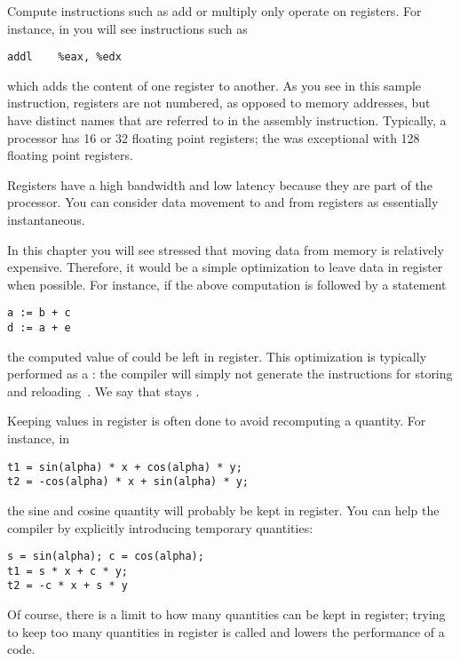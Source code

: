 Compute instructions such as add or multiply only operate on
registers. For instance, in 
you will see instructions such as
\begin{verbatim}
addl	%eax, %edx
\end{verbatim}
which adds the content of one register to
another. As you see in this sample instruction, registers are not
numbered, as opposed to memory addresses,
but have distinct names that are referred to in
the assembly instruction. Typically, a processor has 16 or 32
floating point registers; the  was
exceptional with 128 floating point registers.

Registers have a high bandwidth and low latency because they
are part of the processor. You can consider data movement to and from
registers as essentially instantaneous.

In this chapter you will see stressed that moving data from memory is
relatively expensive. Therefore, it would be a simple optimization to
leave data in register when possible. For instance, if the above
computation is followed by a statement
\begin{verbatim}
a := b + c
d := a + e
\end{verbatim}
the computed value of  could be left in register. This
optimization is typically performed as a
: the compiler will simply not
generate the instructions for storing and reloading~. We say that
 stays .

Keeping values in register is often done to avoid recomputing a
quantity. For instance, in 
\begin{verbatim}
t1 = sin(alpha) * x + cos(alpha) * y;
t2 = -cos(alpha) * x + sin(alpha) * y;
\end{verbatim}
the sine and cosine quantity will probably be kept in register. You
can help the compiler by explicitly introducing temporary quantities:
\begin{verbatim}
s = sin(alpha); c = cos(alpha);
t1 = s * x + c * y;
t2 = -c * x + s * y
\end{verbatim}
Of
course, there is a limit to how many quantities can be kept in
register; trying to keep too many quantities in register is called
 and lowers the performance of a code.

